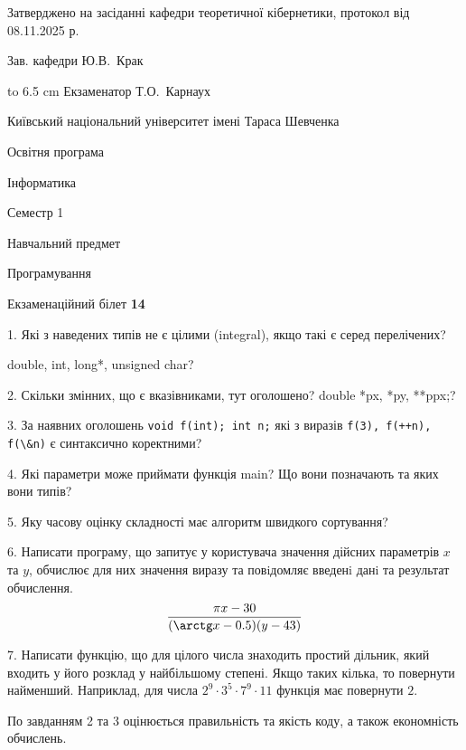 \documentclass[12pt, ukrainian]{article}
\def\code#1{\Verb!#1!}
\begin{document}
{\smallskip\smallskip \begin {scriptsize} Затверджено на засіданні кафедри теоретичної кібернетики, протокол   від   08.11.2025 р.\par\smallskip\smallskip\smallskip\smallskip
{\parbox {6.5 cm} {Зав. кафедри \dotfill Ю.В.~Крак}}\hspace {0.7cm} {\hbox to 6.5 cm { Екзаменатор \dotfill Т.О.~Карнаух}} \end{scriptsize}}
\vspace{0.9cm}
{{\begin {scriptsize}\par
{ \center  Київський національний університет імені Тараса Шевченка \par}
{\parbox {5 cm}{Освітня програма \hfill}{\parbox {7 cm}{Інформатика\hfill}}\parbox {6 cm}{\hfill Семестр 1}}\par
{\parbox {5 cm} {Навчальний предмет \hfill}\parbox {7 cm}{Програмування \hfill}\parbox {6cm}{\hfill}\par}\vspace{-15pt} \end{scriptsize}}{\center Екзаменаційний білет \No \textbf { 14 }\par}}
{%
1. Які з наведених типів не є цілими (integral), якщо такі є серед перелічених?

double, int, long*, unsigned char?
\par
\vspace{2mm}
2. Скільки змінних, що є вказівниками, тут оголошено?
double *px, *py, **ppx;?
\par
\vspace{2mm}
3. За наявних оголошень \code{void f(int); int n;} які з виразів \code{f(3), f(++n), f(\&n)} є синтаксично коректними?
\par
\vspace{2mm}
4. Які параметри може приймати функція main? Що вони позначають та яких вони типів?
\par
\vspace{2mm}
5. Яку часову оцінку складності має алгоритм швидкого сортування?
\par
\vspace{2mm}
6. Написати програму, що запитує у користувача значення дійсних параметрів $x$ та $y$, обчислює для них значення виразу та повiдомляє введенi данi та результат обчислення.
$$\frac{\pi x - 30}{(\arctg x - 0.5) (y - 43)}$$ 

\par
7. Написати функцію, що для цілого числа знаходить простий дільник, який входить у його розклад у найбільшому степені. Якщо таких кілька, то повернути найменший. Наприклад, для числа $2^{9}{\cdot}3^5{\cdot}7^9{\cdot}11$ функція має повернути $2$.

По завданням 2 та 3 оцінюється правильність та якість коду, а також економність обчислень.

}
\end{document}
